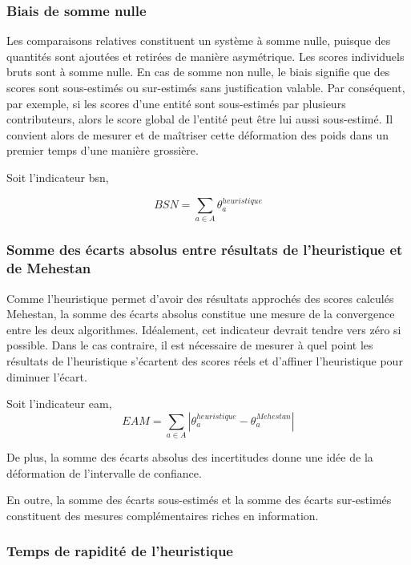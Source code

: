 \subsubsection{Biais de somme nulle}

Les comparaisons relatives constituent un système à somme nulle, puisque des quantités sont ajoutées et retirées de manière asymétrique. Les scores individuels bruts sont à somme nulle. En cas de somme non nulle, le biais signifie que des scores sont sous-estimés ou sur-estimés sans justification valable. Par conséquent, par exemple, si les scores d'une entité sont sous-estimés par plusieurs contributeurs, alors le score global de l'entité peut être lui aussi sous-estimé. Il convient alors de mesurer et de maîtriser cette déformation des poids dans un premier temps d'une manière grossière.

Soit l'indicateur \acrfull{bsn},

\begin{equation}
BSN= \sum_{a \in A} \theta^{heuristique}_{a}
\end{equation}


\subsubsection{Somme des écarts absolus entre résultats de l'heuristique et de Mehestan}

Comme l'heuristique permet d'avoir des résultats approchés des scores calculés Mehestan, la somme des écarts absolus constitue une mesure de la convergence entre les deux algorithmes. Idéalement, cet indicateur devrait tendre vers zéro si possible. Dans le cas contraire, il est nécessaire de mesurer à quel point les résultats de l'heuristique s'écartent des scores réels et d'affiner l'heuristique pour diminuer l'écart.

Soit l'indicateur \acrfull{eam},
\begin{equation}
EAM= \sum_{a \in A} \left| \theta^{heuristique}_{a}-\theta^{Mehestan}_{a} \right| 
\end{equation}



De plus, la somme des écarts absolus des incertitudes donne une idée de la déformation de l'intervalle de confiance.


En outre, la somme des écarts sous-estimés et la somme des écarts sur-estimés constituent des mesures complémentaires riches en information.

\subsubsection{Temps de rapidité de l'heuristique}

